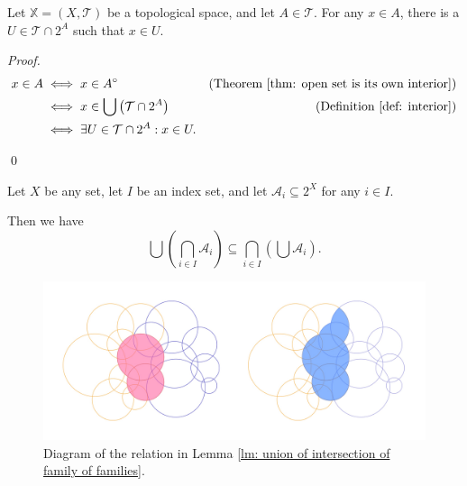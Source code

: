 \begin{corollary}
	\label{col: point in open set}
	Let $\mathbb X = (X, \mathcal T)$ be a topological space, and let $A \in \mathcal T$. For any $x \in A$, there is a $U \in \mathcal T \cap 2^A$ such that $x \in U$.
	
	\begin{proof}
		$$
		\begin{aligned}
			x \in A &\iff x \in A^\circ
				&\text{(Theorem \ref{thm: open set is its own interior})} \\
			&\iff x \in \bigcup\left( \mathcal T \cap 2^A \right)
				&\text{(Definition \ref{def: interior})} \\
			&\iff \exists U \in \mathcal T \cap 2^A: x \in U.
		\end{aligned}
		$$
		
		\qed
	\end{proof}
\end{corollary}


\begin{lemma}
	\label{lm: union of intersection of family of families}
	Let $X$ be any set, let $I$ be an index set, and let $\mathcal A_i \subseteq 2^X$ for any $i \in I$.
	
	Then we have
	$$
	\bigcup \left( \bigcap_{i \in I} \mathcal A_i \right) \subseteq \bigcap_{i \in I} \left( \bigcup \mathcal A_i \right).
	$$
\end{lemma}


\begin{figure}[h]
	\centering
    \includegraphics[width=345pt]{notes-for-general-topology/media/intersection-of-family-of-families}
    \caption{Diagram of the relation in Lemma \ref{lm: union of intersection of family of families}.}
\end{figure}




